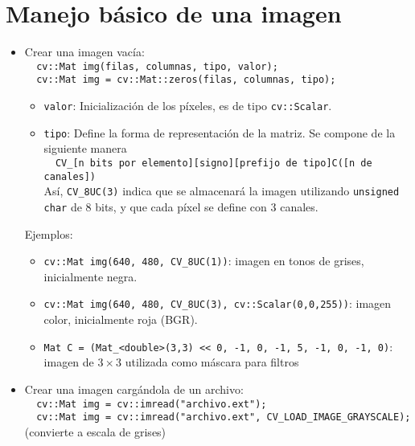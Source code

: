 \documentclass[11pt,a4paper,onecolumn]
{article}
\newcommand{\tc}[1]{\texttt{#1}}
\begin{document}
	\section{Manejo básico de una imagen}
\begin{itemize}
		\item Crear una imagen vacía: \\
			\verb|  cv::Mat img(filas, columnas, tipo, valor);|\\
			\verb|  cv::Mat img = cv::Mat::zeros(filas, columnas, tipo);|

			\begin{itemize}
				\item \tc{valor}: Inicialización de los píxeles, es de tipo \tc{cv::Scalar}.
				\item \tc{tipo}: Define la forma de representación de la matriz. Se compone de la siguiente manera\\
					\verb|  CV_[n bits por elemento][signo][prefijo de tipo]C([n de canales])|\\
					Así, \tc{CV\_8UC(3)} indica que se almacenará la imagen utilizando \tc{unsigned char} de 8 bits, y que cada píxel se define con 3 canales.
			\end{itemize}


			Ejemplos:
			\begin{itemize}
				\item \verb|cv::Mat img(640, 480, CV_8UC(1))|: imagen en tonos de grises, inicialmente negra.
				\item \verb|cv::Mat img(640, 480, CV_8UC(3), cv::Scalar(0,0,255))|: imagen color, inicialmente roja (BGR).
				\item \verb|Mat C = (Mat_<double>(3,3) << 0, -1, 0, -1, 5, -1, 0, -1, 0)|: imagen de $3\times3$ utilizada como máscara para filtros
			\end{itemize}

	\item Crear una imagen cargándola de un archivo: \\
		\verb|  cv::Mat img = cv::imread("archivo.ext");|\\
		\verb|  cv::Mat img = cv::imread("archivo.ext", CV_LOAD_IMAGE_GRAYSCALE);| (convierte a escala de grises)


\end{itemize}
\end{document}
